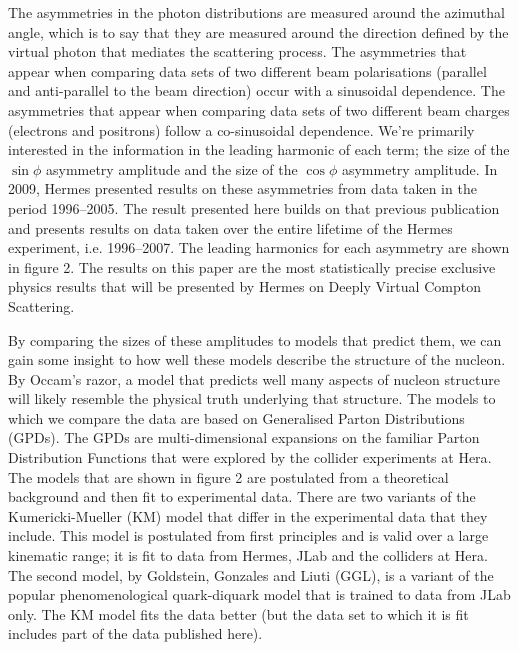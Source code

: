 \documentclass[11pt]{article}
\begin{document}
The asymmetries in the photon distributions are measured around the azimuthal angle, which is to say that they are measured around the direction defined by the virtual photon that mediates the scattering process. The asymmetries that appear when comparing data sets of two different beam polarisations (parallel and anti-parallel to the beam direction) occur with a sinusoidal dependence. The asymmetries that appear when comparing data sets of two different beam charges (electrons and positrons) follow a co-sinusoidal dependence. We're primarily interested in the information in the leading harmonic of each term; the size of the $\sin\phi$ asymmetry amplitude and the size of the $\cos\phi$ asymmetry amplitude. In 2009, H{\sc ermes} presented results on these asymmetries from data taken in the period 1996--2005. The result presented here builds on that previous publication and presents results on data taken over the entire lifetime of the H{\sc ermes} experiment, i.e. 1996--2007. The leading harmonics for each asymmetry are shown in figure 2. The results on this paper are the most statistically precise exclusive physics results that will be presented by H{\sc ermes} on Deeply Virtual Compton Scattering.

By comparing the sizes of these amplitudes to models that predict them, we can gain some insight to how well these models describe the structure of the nucleon. By Occam's razor, a model that predicts well many aspects of nucleon structure will likely resemble the physical truth underlying that structure. The models to which we compare the data are based on Generalised Parton Distributions (GPDs). The GPDs are multi-dimensional expansions on the familiar Parton Distribution Functions that were explored by the collider experiments at H{\sc era}. The models that are shown in figure 2 are postulated from a theoretical background and then fit to experimental data. There are two variants of the Kumericki-Mueller (KM) model that differ in the experimental data that they include. This model is postulated from first principles and is valid over a large kinematic range; it is fit to data from H{\sc ermes}, JLab and the colliders at H{\sc era}. The second model, by Goldstein, Gonzales and Liuti (GGL), is a variant of the popular phenomenological quark-diquark model that is trained to data from JLab only. The KM model fits the data better (but the data set to which it is fit includes part of the data published here).
\end{document}
